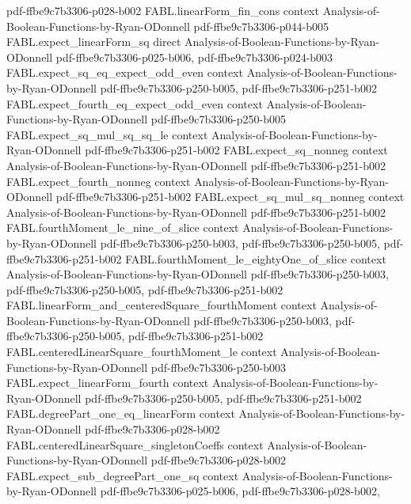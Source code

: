 \begin{theorem}
  {pdf-ffbe9c7b3306-p028-b002}
\proofstep
  {FABL.linearForm_fin_cons}
  {context}
  {Analysis-of-Boolean-Functions-by-Ryan-ODonnell}
  {pdf-ffbe9c7b3306-p044-b005}
\proofstep
  {FABL.expect_linearForm_sq}
  {direct}
  {Analysis-of-Boolean-Functions-by-Ryan-ODonnell}
  {pdf-ffbe9c7b3306-p025-b006,
    pdf-ffbe9c7b3306-p024-b003}
\proofstep
  {FABL.expect_sq_eq_expect_odd_even}
  {context}
  {Analysis-of-Boolean-Functions-by-Ryan-ODonnell}
  {pdf-ffbe9c7b3306-p250-b005,
    pdf-ffbe9c7b3306-p251-b002}
\proofstep
  {FABL.expect_fourth_eq_expect_odd_even}
  {context}
  {Analysis-of-Boolean-Functions-by-Ryan-ODonnell}
  {pdf-ffbe9c7b3306-p250-b005}
\proofstep
  {FABL.expect_sq_mul_sq_sq_le}
  {context}
  {Analysis-of-Boolean-Functions-by-Ryan-ODonnell}
  {pdf-ffbe9c7b3306-p251-b002}
\proofstep
  {FABL.expect_sq_nonneg}
  {context}
  {Analysis-of-Boolean-Functions-by-Ryan-ODonnell}
  {pdf-ffbe9c7b3306-p251-b002}
\proofstep
  {FABL.expect_fourth_nonneg}
  {context}
  {Analysis-of-Boolean-Functions-by-Ryan-ODonnell}
  {pdf-ffbe9c7b3306-p251-b002}
\proofstep
  {FABL.expect_sq_mul_sq_nonneg}
  {context}
  {Analysis-of-Boolean-Functions-by-Ryan-ODonnell}
  {pdf-ffbe9c7b3306-p251-b002}
\proofstep
  {FABL.fourthMoment_le_nine_of_slice}
  {context}
  {Analysis-of-Boolean-Functions-by-Ryan-ODonnell}
  {pdf-ffbe9c7b3306-p250-b003,
    pdf-ffbe9c7b3306-p250-b005,
    pdf-ffbe9c7b3306-p251-b002}
\proofstep
  {FABL.fourthMoment_le_eightyOne_of_slice}
  {context}
  {Analysis-of-Boolean-Functions-by-Ryan-ODonnell}
  {pdf-ffbe9c7b3306-p250-b003,
    pdf-ffbe9c7b3306-p250-b005,
    pdf-ffbe9c7b3306-p251-b002}
\proofstep
  {FABL.linearForm_and_centeredSquare_fourthMoment}
  {context}
  {Analysis-of-Boolean-Functions-by-Ryan-ODonnell}
  {pdf-ffbe9c7b3306-p250-b003,
    pdf-ffbe9c7b3306-p250-b005,
    pdf-ffbe9c7b3306-p251-b002}
\proofstep
  {FABL.centeredLinearSquare_fourthMoment_le}
  {context}
  {Analysis-of-Boolean-Functions-by-Ryan-ODonnell}
  {pdf-ffbe9c7b3306-p250-b003}
\proofstep
  {FABL.expect_linearForm_fourth}
  {context}
  {Analysis-of-Boolean-Functions-by-Ryan-ODonnell}
  {pdf-ffbe9c7b3306-p250-b005,
    pdf-ffbe9c7b3306-p251-b002}
\proofstep
  {FABL.degreePart_one_eq_linearForm}
  {context}
  {Analysis-of-Boolean-Functions-by-Ryan-ODonnell}
  {pdf-ffbe9c7b3306-p028-b002}
\proofstep
  {FABL.centeredLinearSquare_singletonCoeffs}
  {context}
  {Analysis-of-Boolean-Functions-by-Ryan-ODonnell}
  {pdf-ffbe9c7b3306-p028-b002}
\proofstep
  {FABL.expect_sub_degreePart_one_sq}
  {context}
  {Analysis-of-Boolean-Functions-by-Ryan-ODonnell}
  {pdf-ffbe9c7b3306-p025-b006,
    pdf-ffbe9c7b3306-p028-b002,
}
\end{theorem}
